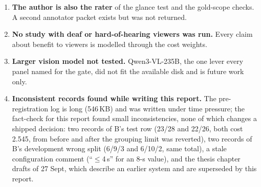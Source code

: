 \begin{enumerate}[label=\textbf{D\arabic*.}, leftmargin=*]
  \item \textbf{The author is also the rater} of the glance test and the gold-scope checks. A second annotator packet
        exists but was not returned.
  \item \textbf{No study with deaf or hard-of-hearing viewers was run.} Every claim about benefit to viewers is
        modelled through the cost weights.
  \item \textbf{Larger vision model not tested.} Qwen3-VL-235B, the one lever every panel named for the gate, did
        not fit the available disk and is future work only.
  \item \textbf{Inconsistent records found while writing this report.} The pre-registration log is long (546\,KB) and
        was written under time pressure; the fact-check for this report found small inconsistencies, none of which
        changes a shipped decision: two records of B's test row (23/28 and 22/26, both cost 2.545, from before and after
        the grouping limit was reverted), two records of B's development wrong split (6/9/3 and 6/10/2, same total), a
        stale configuration comment (``$\leq$4\,s'' for an 8-s value), and the thesis chapter drafts of 27 Sept, which
        describe an earlier system and are superseded by this report.
\end{enumerate}
